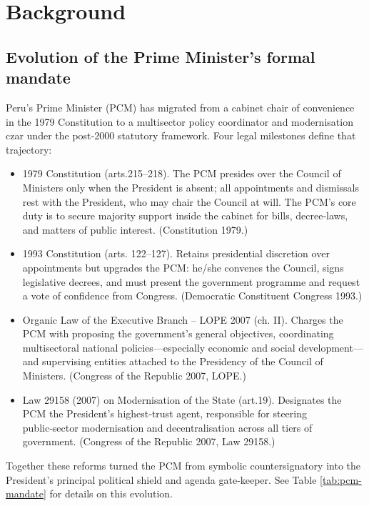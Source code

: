 \documentclass[a4paper, 12pt]{article}
\begin{document}
\section{Background}\label{backg-tables} %

\subsection{Evolution of the Prime Minister’s formal mandate} Peru’s Prime Minister (PCM) has migrated from a cabinet chair of convenience in the 1979 Constitution to a multisector policy coordinator and modernisation czar under the post‑2000 statutory framework.  Four legal milestones define that trajectory:


\begin{itemize}
\item 1979 Constitution (arts.215–218). The PCM presides over the Council of Ministers only when the President is absent; all appointments and dismissals rest with the President, who may chair the Council at will.  The PCM’s core duty is to secure majority support inside the cabinet for bills, decree‑laws, and matters of public interest. (Constitution 1979.)

\item 1993 Constitution (arts. 122–127). Retains presidential discretion over appointments but upgrades the PCM: he/she convenes the Council, signs legislative decrees, and must present the government programme and request a vote of confidence from Congress. (Democratic Constituent Congress 1993.)
\item Organic Law of the Executive Branch – LOPE 2007 (ch. II). Charges the PCM with proposing the government’s general objectives, coordinating multisectoral national policies—especially economic and social development—and supervising entities attached to the Presidency of the Council of Ministers. (Congress of the Republic 2007, LOPE.)
\item Law 29158 (2007) on Modernisation of the State (art.19). Designates the PCM the President’s highest‑trust agent, responsible for steering public‑sector modernisation and decentralisation across all tiers of government.  (Congress of the Republic 2007, Law 29158.)
\end{itemize}

Together these reforms turned the PCM from symbolic countersignatory into the President’s principal political shield and agenda gate‑keeper. See Table \ref{tab:pcm-mandate} for details on this evolution.
\end{document}
